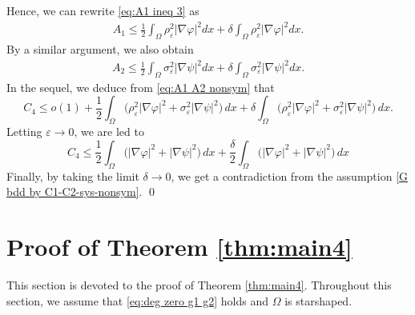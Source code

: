 \documentclass[a4paper,10pt,reqno]{amsart}
\theoremstyle{definition}
\newcommand{\ve}{{\varepsilon}}
\newcommand{\vp}{{\varphi}}
\newcommand{\Om}{{\Omega}}
\numberwithin{equation}{section}
\begin{document}
Hence, we can rewrite \eqref{eq:A1 ineq 3} as
\begin{align*}
 A_1 \le  \frac{1}{2}\int_\Omega  \rho_\varepsilon^2   |\nabla \vp|^2 dx  +    \delta \int_\Omega  \rho_\varepsilon^2    |\nabla \vp|^2 dx.
\end{align*}
By a similar argument, we also obtain
\begin{align*}
 A_2 \le  \frac{1}{2}\int_\Omega  \sigma_\varepsilon^2   |\nabla \psi|^2 dx  +   \delta  \int_\Omega     \sigma_\varepsilon^2 |\nabla \psi|^2 dx.
\end{align*}
In the sequel, we deduce from   \eqref{eq:A1 A2 nonsym} that
\[  C_4  \le o(1) +  \frac{1}{2}\int_\Omega  \big( \rho_\varepsilon^2   |\nabla \vp|^2+\sigma_\ve^2  |\nabla \psi|^2 \big) \, dx +  \delta \int_\Omega  \big( \rho_\ve^2  |\nabla \vp|^2 + \sigma_\ve^2 |\nabla \psi|^2 \big) \,dx.
\]
Letting $\ve \to 0$, we are led to
\[ C_4 \le \frac{1}{2}\int_\Omega  \big(    |\nabla \vp|^2+   |\nabla \psi|^2 \big) \, dx + \frac{ \delta}{2}\int_\Omega  \big(    |\nabla \vp|^2 +   |\nabla \psi|^2 \big) \,dx
\]
Finally, by taking the limit $\delta \to 0$, we get a contradiction from   the assumption \eqref{G bdd by C1-C2-sys-nonsym}.
\qed
\smallskip




 \bigskip
\section{Proof of Theorem \ref{thm:main4}}\label{sec:thm pf main4}

This section is devoted to the proof of  Theorem \ref{thm:main4}.
Throughout this section, we assume that \eqref{eq:deg zero g1 g2} holds and $\Om$ is starshaped.\\
\end{document}
